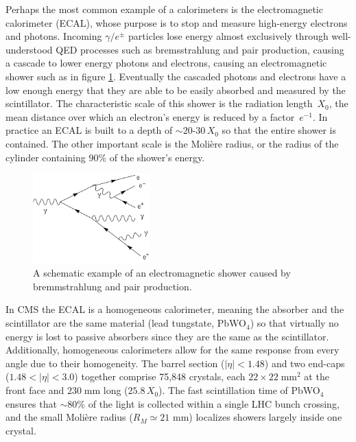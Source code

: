 Perhaps the most common example of a calorimeters is the electromagnetic calorimeter (ECAL), whose purpose is to stop and measure high-energy electrons and photons.  Incoming $\gamma/e^{\pm}$ particles lose energy almost exclusively through well-understood QED processes such as bremsstrahlung and pair production, causing a cascade to lower energy photons and electrons, causing an electromagnetic shower such as in figure \ref{fig:electromagnetic-shower}. Eventually the cascaded photons and electrons have a low enough energy that they are able to be easily absorbed and measured by the scintillator.  The characteristic scale of this shower is the radiation length~$X_{0}$, the mean distance over which an electron's energy is reduced by a factor~$e^{-1}$.  In practice an ECAL is built to a depth of $\sim\!20$-30\,$X_{0}$ so that the entire shower is contained. The other important scale is the Molière radius, or the radius of the cylinder containing $90\%$ of the shower's energy.

\begin{figure}[htbp]
    \centering
    \includegraphics[width=0.4\textwidth]{figures/chapter3/electromagnetic-shower.png}
    \caption{A schematic example of an electromagnetic shower caused by bremmstrahlung and pair production.}
    \label{fig:electromagnetic-shower}
\end{figure}

In CMS the ECAL is a homogeneous calorimeter, meaning the absorber and the scintillator are the same material (lead tungstate, PbWO$_4$) so that virtually no energy is lost to passive absorbers since they are the same as the scintillator. Additionally, homogeneous calorimeters allow for the same response from every angle due to their homogeneity. The barrel section ($|\eta|<1.48$) and two end-caps ($1.48<|\eta|<3.0$) together comprise 75,848 crystals, each $22\times22\;\text{mm}^2$ at the front face and $230\;\text{mm}$ long ($25.8\,X_{0}$). The fast scintillation time of PbWO$_4$ ensures that $\sim80\%$ of the light is collected within a single LHC bunch crossing, and the small Molière radius ($R_M\simeq21$ mm) localizes showers largely inside one crystal.  

